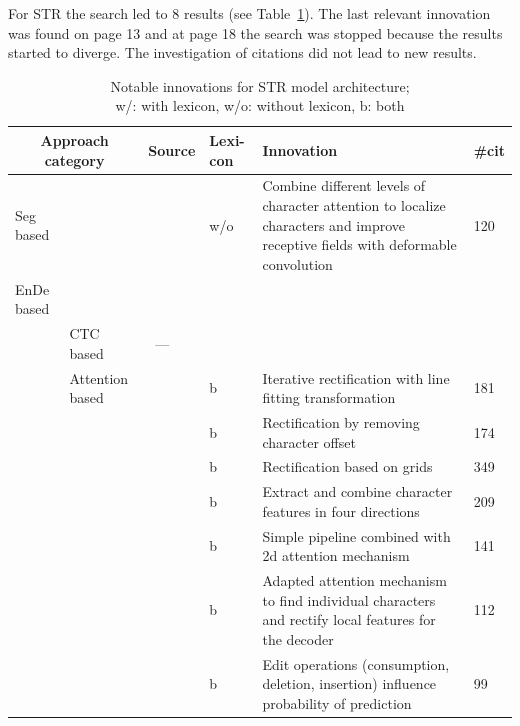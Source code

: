For \ac{STR} the search led to 8 results (see Table~\ref{tb:STR-steps-properties}).
The last relevant innovation was found on page 13 and at page 18 the search was stopped because
the results started to diverge.
The investigation of citations did not lead to new results.
\begin{table}[h]
    \centering\scriptsize
    \begin{tabular}{p{}p{}p{}p{}
            p{}p{}}
        \multicolumn{2}{c}{Approach category} & Source & Lexi-con & Innovation & \#cit \\
        \toprule
        Seg based & &~\cite{liao_scene_2018} & w/o & Combine different levels of character attention
            to localize characters and improve receptive fields with deformable convolution & 120 \\
        \midrule
        \ac{EnDe} based & & & \\
            & CTC based &~--- & & \\
            & Attention based &~\cite{zhan_esir_2019} & b & Iterative rectification with line fitting
                transformation & 181 \\
            & &~\cite{luo_multi-object_2019} & b & Rectification by removing character offset & 174 \\
            & &~\cite{shi_aster_2019} & b & Rectification based on grids & 349 \\
            & &~\cite{cheng_aon_2018} & b & Extract and combine character features in four directions
                & 209 \\
            & &~\cite{li_show_2019} & b & Simple pipeline combined with 2d attention mechanism & 141\\
            & &~\cite{liu_char-net_2018} & b & Adapted attention mechanism to find
                individual characters and rectify local features for the decoder & 112 \\
            & &~\cite{bai_edit_2018} & b & Edit operations (consumption, deletion, insertion)
                influence probability of prediction & 99 \\
        \bottomrule
    \end{tabular}
    \captionsetup{justification=centering}
    \caption[Notable innovations for STR model architecture]{%
        Notable innovations for STR model architecture; \\
        w/: with lexicon, w/o: without lexicon, b: both\label{tb:STR-steps-properties}
    }
\end{table}
